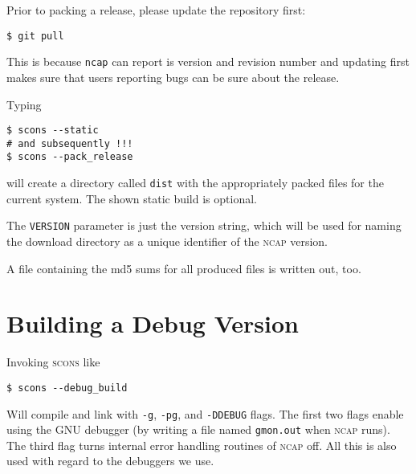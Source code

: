 Prior to packing a release, please update the repository first:
\begin{lstlisting}[style=shell]
$ git pull
\end{lstlisting}
This is because \texttt{ncap} can report is version and revision number and updating first makes sure that users reporting bugs can be sure about the release.

Typing
\begin{lstlisting}[style=shell]
$ scons --static
# and subsequently !!!
$ scons --pack_release
\end{lstlisting}
will create a directory called \texttt{dist} with the appropriately packed files for the current system. The shown static build is optional.


The \texttt{VERSION} parameter is just the version string, which will be used for naming the download directory as a unique identifier of the \textsc{ncap} version.

A file containing the md5 sums for all produced files is written out, too.


\section{Building a Debug Version}

Invoking \textsc{scons} like
\begin{lstlisting}[style=shell]
$ scons --debug_build
\end{lstlisting}
Will compile and link with \verb+-g+, \verb+-pg+, and \verb+-DDEBUG+ flags. The first two flags enable using the GNU debugger (by writing a file named \verb+gmon.out+ when \textsc{ncap} runs). The third flag turns internal error handling routines of \textsc{ncap} off. All this is also used with regard to the debuggers we use.

